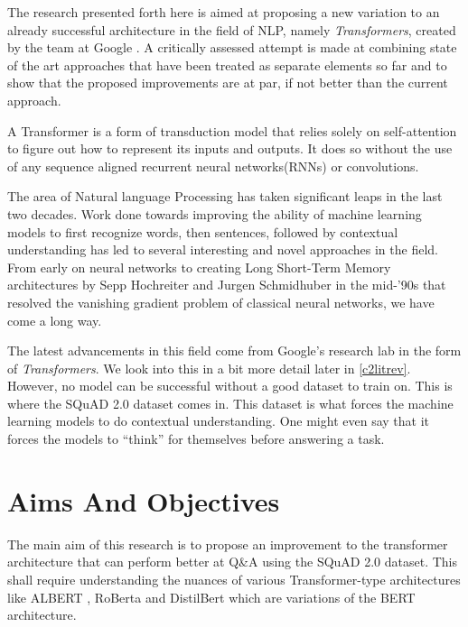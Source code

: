 \documentclass[a4paper,12pt]{report}
\begin{document}
		    The research presented forth here is aimed at proposing a new variation to an already successful architecture in the field of NLP, namely \textit{Transformers}, created by the team at Google \citep{atayl}. A critically assessed attempt is made at combining state of the art approaches that have been treated as separate elements so far and to show that the proposed improvements are at par, if not better than the current approach.
		    
		    A Transformer is a form of transduction model that relies solely on self-attention to figure out how to represent its inputs and outputs. It does so without the use of any sequence aligned recurrent neural networks(RNNs) or convolutions.
		  
            The area of Natural language Processing has taken significant leaps in the last two decades. Work done towards improving the ability of machine learning models to first recognize words, then sentences, followed by contextual understanding has led to several interesting and novel approaches in the field. From early on neural networks to creating Long Short-Term Memory architectures \citep{lstmoriginal} by Sepp Hochreiter and Jurgen Schmidhuber in the mid-'90s that resolved the vanishing gradient problem of classical neural networks, we have come a long way.

           The latest advancements in this field come from Google's research lab in the form of \textit{Transformers}. We look into this in a bit more detail later in \ref{c2litrev}. However, no model can be successful without a good dataset to train on. This is where the SQuAD 2.0 dataset \citep{dataset} comes in. This dataset is what forces the machine learning models to do contextual understanding. One might even say that it forces the models to ``think'' for themselves before answering a task.


        \section{Aims And Objectives}\label{12}
        	The main aim of this research is to propose an improvement to the transformer architecture that can perform better at Q\&A using the SQuAD 2.0 dataset. This shall require understanding the nuances of various Transformer-type architectures like ALBERT \citep{albert}, RoBerta \citep{roberta} and DistilBert \citep{distil} which are variations of the BERT \citep{bert} architecture. 
        	
\end{document}

